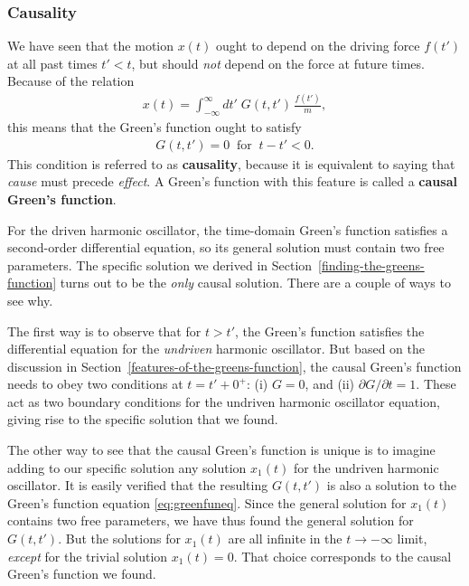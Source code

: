 \documentclass[10pt,a4paper]{article}
\begin{document}
\subsubsection{Causality}
\label{causality}

We have seen that the motion $x(t)$ ought to depend on the driving
force $f(t')$ at all past times $t' < t$, but should \textit{not}
depend on the force at future times.  Because of the relation
\begin{align}
  x(t) = \int_{-\infty}^\infty dt'\; G(t,t')\, \frac{f(t')}{m},
\end{align}
this means that the Green's function ought to satisfy
\begin{align}
  G(t,t') = 0 \;\; \mathrm{for}\;\; t -t' < 0.
\end{align}
This condition is referred to as \textbf{causality}, because it is
equivalent to saying that \textit{cause} must precede \textit{effect}.
A Green's function with this feature is called a \textbf{causal
  Green's function}.

For the driven harmonic oscillator, the time-domain Green's function
satisfies a second-order differential equation, so its general
solution must contain two free parameters.  The specific solution we
derived in Section~\ref{finding-the-greens-function} turns out to be
the \textit{only} causal solution. There are a couple of ways to see
why.

The first way is to observe that for $t > t'$, the Green's function
satisfies the differential equation for the \textit{undriven} harmonic
oscillator. But based on the discussion in
Section~\ref{features-of-the-greens-function}, the causal Green's
function needs to obey two conditions at $t = t' + 0^+$: (i) $G = 0$,
and (ii) $\partial G / \partial t = 1$. These act as two boundary
conditions for the undriven harmonic oscillator equation, giving rise
to the specific solution that we found.

The other way to see that the causal Green's function is unique is to
imagine adding to our specific solution any solution $x_1(t)$ for the
undriven harmonic oscillator.  It is easily verified that the
resulting $G(t,t')$ is also a solution to the Green's function
equation \eqref{eq:greenfuneq}. Since the general solution for
$x_1(t)$ contains two free parameters, we have thus found the general
solution for $G(t,t')$. But the solutions for $x_1(t)$ are all
infinite in the $t \rightarrow -\infty$ limit, \textit{except} for the
trivial solution $x_1(t) = 0$. That choice corresponds to the causal
Green's function we found.
\end{document}
